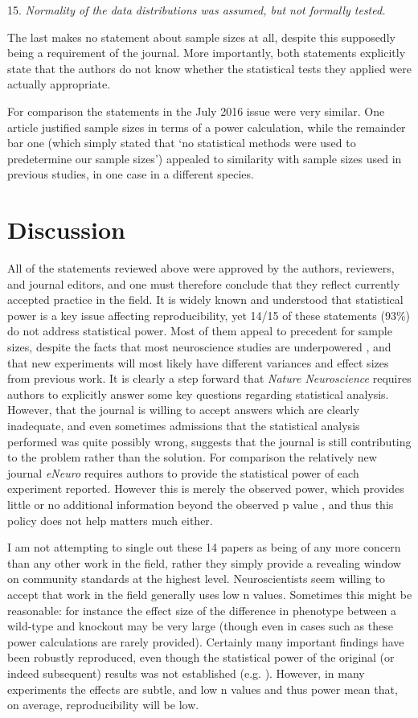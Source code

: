 \documentclass[a4paper,11pt]{article}
\begin{document}
15. {\em Normality of the data distributions was assumed, but not
  formally tested.}

The last makes no statement about sample sizes at all, despite this
supposedly being a requirement of the journal. More importantly, both
statements explicitly state that the authors do not know whether the
statistical tests they applied were actually appropriate.

For comparison the statements in the July 2016 issue were very
similar. One article justified sample sizes in terms of a power
calculation, while the remainder bar one (which simply stated that `no
statistical methods were used to predetermine our sample sizes')
appealed to similarity with sample sizes used in previous studies, in
one case in a different species.

\section*{Discussion}

All of the statements reviewed above were approved by the authors,
reviewers, and journal editors, and one must therefore conclude that
they reflect currently accepted practice in the field. It is widely
known and understood that statistical power is a key issue affecting
reproducibility, yet 14/15 of these statements (93\%) do not address
statistical power. Most of them appeal to precedent for sample sizes,
despite the facts that most neuroscience studies are underpowered
\cite{button13}, and that new experiments will most likely have
different variances and effect sizes from previous work. It is clearly
a step forward that {\em Nature Neuroscience} requires authors to
explicitly answer some key questions regarding statistical
analysis. However, that the journal is willing to accept answers which
are clearly inadequate, and even sometimes admissions that the
statistical analysis performed was quite possibly wrong, suggests that
the journal is still contributing to the problem rather than the
solution. For comparison the relatively new journal {\em eNeuro}
requires authors to provide the statistical power of each experiment
reported. However this is merely the observed power, which provides
little or no additional information beyond the observed p value
\cite{lenth01}, and thus this policy does not help matters much
either.

I am not attempting to single out these 14 papers as being of any more
concern than any other work in the field, rather they simply provide a
revealing window on community standards at the highest
level. Neuroscientists seem willing to accept that work in the field
generally uses low n values. Sometimes this might be reasonable: for
instance the effect size of the difference in phenotype between a
wild-type and knockout may be very large (though even in
cases such as these power calculations are rarely provided). Certainly
many important findings have been robustly reproduced, even though the
statistical power of the original (or indeed subsequent) results was
not established (e.g. \cite{bliss73}).  However, in many experiments
the effects are subtle, and low n values and thus power mean that, on
average, reproducibility will be low.
\end{document}
